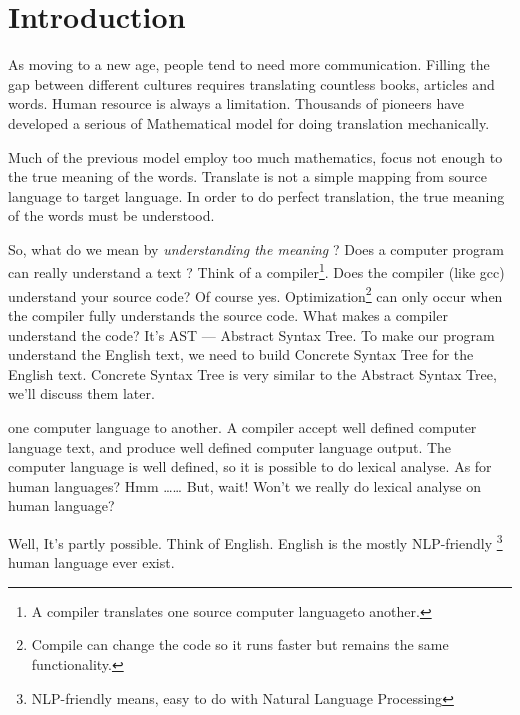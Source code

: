 \section{Introduction}

\noindent As moving to a new age, people tend to need more communication.
Filling the gap between different cultures requires translating countless books, articles and words.
Human resource is always a limitation.
Thousands of pioneers have developed a serious of Mathematical model for doing translation mechanically. 

Much of the previous model employ too much mathematics, focus not enough to the true meaning
of the words.
Translate is not a simple mapping from source language to target language.
In order to do perfect translation, the true meaning of the words must be understood. 

So, what do we mean by \emph{understanding the meaning} ? 
Does a computer program can really understand a text ?
Think of a compiler\footnote{ A compiler translates one source computer language\footnotemark to another.}.
Does the compiler (like gcc) understand your source code?
Of course yes.
Optimization\footnote{Compile can change the code so it runs faster but remains the same functionality. } can only occur when the compiler fully understands the source code.
What makes a compiler understand the code? It's AST --- Abstract Syntax Tree.
To make our program understand the English text, we need to build Concrete Syntax Tree for the English text. Concrete Syntax Tree is very similar to the Abstract Syntax Tree, we'll discuss them later.



one computer language to another. A compiler accept well defined computer language
text, and produce well defined computer language output. The computer language is well
defined, so it is possible to do lexical analyse. As for human languages? Hmm \ldots\ldots 
But, wait! Won't we really do lexical analyse on human language?

Well, It's partly possible. Think of English. English is the mostly
NLP-friendly \footnote{NLP-friendly means, easy to do with Natural Language Processing} human language ever exist.
